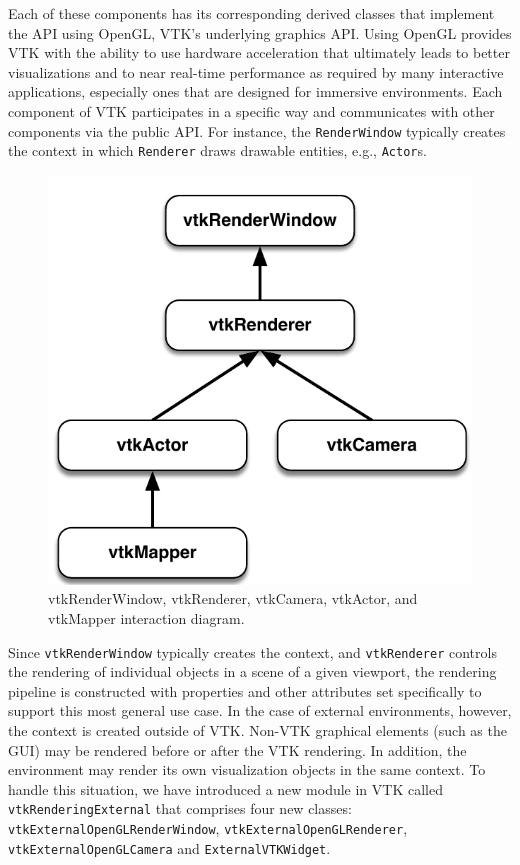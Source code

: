 Each of these components has its corresponding derived classes that implement the API using OpenGL, VTK's underlying graphics API.
Using OpenGL provides VTK with the ability to use hardware acceleration that ultimately leads to better visualizations and to near real-time performance as required by many interactive applications, especially ones that are designed for immersive environments.
Each component of VTK participates in a specific way and communicates with other components via the public API.
For instance, the \texttt{RenderWindow} typically creates the context in which
\texttt{Renderer} draws drawable entities, e.g., \texttt{Actor}s.

\begin{figure}[h!]
  \centering
  \includegraphics[scale=0.5]{images/vtkRenderPipeline.pdf}
  \caption{vtkRenderWindow, vtkRenderer, vtkCamera, vtkActor, and vtkMapper interaction diagram.}
  \label{fig:vtkRenderPipeline}
\end{figure}

Since \texttt{vtkRenderWindow} typically creates the context, and \texttt{vtkRenderer} controls the rendering of individual objects in a scene of a given viewport, the rendering pipeline is constructed with properties and other attributes set specifically to support this most general use case.
In the case of external environments, however, the context is created outside of VTK. Non-VTK graphical elements (such as the GUI) may be rendered before or after the VTK rendering.
In addition, the environment may render its own visualization objects in the same context.
To handle this situation, we have introduced a new module in VTK called \texttt{vtkRenderingExternal} that comprises four new classes: \texttt{vtkExternalOpenGLRenderWindow}, \texttt{vtkExternalOpenGLRenderer}, \texttt{vtkExternalOpenGLCamera} and \texttt{ExternalVTKWidget}. 

